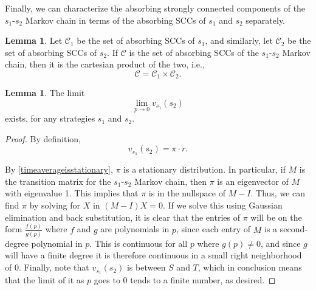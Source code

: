 \documentclass[11pt]{amsart}
\theoremstyle{definition}
\newtheorem{lemma}[theorem]{Lemma}
\theoremstyle{remark}
\begin{document}
Finally, we can characterize the absorbing strongly connected components of the $s_1$-$s_2$ Markov chain in terms of the absorbing SCCs of $s_1$ and $s_2$ separately.

\begin{lemma}
  \label{absorbingstronglyconnectedcomponentscartesianproduct}
  Let $\mathcal{C}_1$ be the set of absorbing SCCs of $s_1$, and similarly, let $\mathcal{C}_2$ be the set of absorbing SCCs of $s_2$. If $\mathcal{C}$ is the set of absorbing SCCs of the $s_1$-$s_2$ Markov chain, then it is the cartesian product of the two, i.e.,
  \begin{equation*}
    \mathcal{C} = \mathcal{C}_1 \times \mathcal{C}_2.
  \end{equation*}
\end{lemma}

\begin{lemma}
  \label{limitvexists}
  The limit \begin{equation*}
    \lim_{p \to 0} v_{s_1}(s_2)
  \end{equation*}
  exists, for any strategies $s_1$ and $s_2$.
\end{lemma}
\begin{proof}
  By definition, \begin{equation*}
    v_{s_1}(s_2) = \pi \cdot r.
  \end{equation*}

  By \cref{timeaverageisstationary}, $\pi$ is a stationary distribution. In particular, if $M$ is the transition matrix for the $s_1$-$s_2$ Markov chain, then $\pi$ is an eigenvector of $M$ with eigenvalue 1. This implies that $\pi$ is in the nullspace of $M - I$. Thus, we can find $\pi$ by solving for $X$ in $(M - I)X = 0$. If we solve this using Gaussian elimination and back substitution, it is clear that the entries of $\pi$ will be on the form $\frac{f(p)}{g(p)}$ where $f$ and $g$ are polynomials in $p$, since each 
  entry of $M$ is a second-degree polynomial in $p$. This is continuous for all $p$ where $g(p) \neq 0$, and since $g$ will have a finite degree it is therefore continuous in a small right neighborhood of 0. Finally, note that $v_{s_1}(s_2)$ is between $S$ and $T$, which in conclusion means that the limit of it as $p$ goes to 0 tends to a finite number, as desired.
\end{proof}
\end{document}
